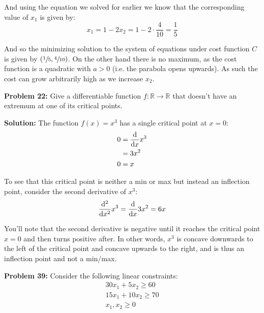 \documentclass{article}
\newcommand{\R}{\mathbb R}
\begin{document}
And using the equation we solved for earlier we know that the corresponding value of $x_1$ is given by:
\begin{equation*}
    x_1=1-2x_2=1-2\cdot\frac{4}{10}=\frac{1}{5}
\end{equation*}

And so the minimizing solution to the system of equations under cost function $C$ is given by $(\sfrac{1}{5},\sfrac{4}{10})$. On the other hand there is no maximum, as the cost function is a quadratic with $a>0$ (i.e. the parabola opens upwards). As such the cost can grow arbitrarily high as we increase $x_2$.
\bigskip

\noindent\textbf{Problem 22:} Give a differentiable function $f:\R\to\R$ that doesn't have an extremum at one of its critical points.
\bigskip

\noindent\textbf{Solution:} The function $f(x)=x^3$ has a single critical point at $x=0$:
\begin{align*}
    0&=\dv{x}x^3\\
    &=3x^2\\
    0&=x
\end{align*}

To see that this critical point is neither a min or max but instead an inflection point, consider the second derivative of $x^3$:
\begin{equation*}
    \dv[2]{x}x^3=\dv{x}3x^2=6x
\end{equation*}

You'll note that the second derivative is negative until it reaches the critical point $x=0$ and then turns positive after. In other words, $x^3$ is concave downwards to the left of the critical point and concave upwards to the right, and is thus an inflection point and not a min/max.
\bigskip
\newpage

\noindent\textbf{Problem 39:} Consider the following linear constraints:
\begin{align*}
    30x_1+5x_2\ge 60\\
    15x_1+10x_2\ge 70\\
    x_1,x_2\ge 0
\end{align*}
\end{document}
